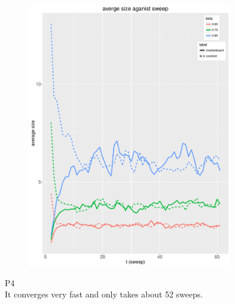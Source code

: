 \documentclass[12pt, oneside]{article}   	%
\begin{document}
\begin{figure}[H]
            \centering
            \includegraphics[width=0.8\textwidth, height=0.4\textheight]{size.pdf}
\end{figure}
P4\\
It converges very fast and only takes about 52 sweeps.
\end{document}

